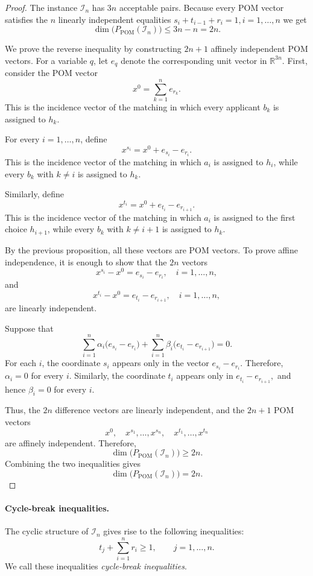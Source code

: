 \documentclass[12pt]{report}
\numberwithin{algorithm}{chapter}
\begin{document}
	\begin{proof}
		The instance $\mathcal{I}_n$ has $3n$ acceptable pairs. Because every POM vector satisfies the $n$ linearly independent equalities
		$s_i+t_{i-1}+r_i=1, i=1,\ldots,n$
		we get
		\[
		\dim\bigl(P_{\mathrm{POM}}(\mathcal{I}_n)\bigr)
		\le 3n-n
		=2n.
		\]
		
		We prove the reverse inequality by constructing $2n+1$ affinely independent POM vectors. For a variable $q$, let $e_q$ denote the corresponding unit vector in $\mathbb{R}^{3n}$. First, consider the POM vector
		\[
		x^{0}=\sum_{k=1}^{n}e_{r_k}.
		\]
		This is the incidence vector of the matching in which every applicant $b_k$ is assigned to $h_k$.
		
		For every $i=1,\ldots,n$, define
		\[
		x^{s_i}=x^{0}+e_{s_i}-e_{r_i}.
		\]
		This is the incidence vector of the matching in which $a_i$ is assigned to $h_i$, while every $b_k$ with $k\ne i$ is assigned to $h_k$.
		
		Similarly, define
		\[
		x^{t_i}=x^{0}+e_{t_i}-e_{r_{i+1}}.
		\]
		This is the incidence vector of the matching in which $a_i$ is assigned to the first choice $h_{i+1}$, while every $b_k$ with $k\ne i+1$ is assigned to $h_k$.
		
		By the previous proposition, all these vectors are POM vectors. To prove affine independence, it is enough to show that the $2n$ vectors
		\[
		x^{s_i}-x^{0}=e_{s_i}-e_{r_i},
		\quad i=1,\ldots,n,
		\]
		and
		\[
		x^{t_i}-x^{0}=e_{t_i}-e_{r_{i+1}},
		\quad i=1,\ldots,n,
		\]
		are linearly independent.
		
		Suppose that
		\[
		\sum_{i=1}^{n}\alpha_i
		\bigl(e_{s_i}-e_{r_i}\bigr)
		+
		\sum_{i=1}^{n}\beta_i
		\bigl(e_{t_i}-e_{r_{i+1}}\bigr)
		=0.
		\]
		For each $i$, the coordinate $s_i$ appears only in the vector
		$e_{s_i}-e_{r_i}.$
		Therefore, $\alpha_i=0$ for every $i$. Similarly, the coordinate $t_i$ appears only in
		$e_{t_i}-e_{r_{i+1}},$
		and hence $\beta_i=0$ for every $i$.
		
		Thus, the $2n$ difference vectors are linearly independent, and the $2n+1$ POM vectors
		\[
		x^{0},
		\quad
		x^{s_1},\ldots,x^{s_n},
		\quad
		x^{t_1},\ldots,x^{t_n}
		\]
		are affinely independent. Therefore,
		\[
		\dim\bigl(P_{\mathrm{POM}}(\mathcal{I}_n)\bigr)\ge 2n.
		\]
		Combining the two inequalities gives
		\[
		\dim\bigl(P_{\mathrm{POM}}(\mathcal{I}_n)\bigr)=2n.
		\]
	\end{proof}
	
	\paragraph{Cycle-break inequalities.}
	The cyclic structure of $\mathcal{I}_n$ gives rise to the following inequalities:
	\begin{equation}\label{eq:cycle-break-inequality}
		t_j+\sum_{i=1}^{n}r_i\ge 1,
		\qquad j=1,\ldots,n.
	\end{equation}
	We call these inequalities \emph{cycle-break inequalities}.
	
\end{document}
